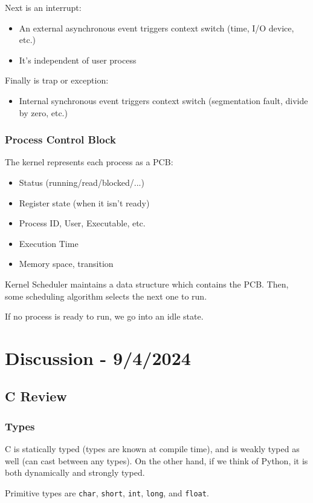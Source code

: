 \documentclass[openany]{book}
\begin{document}
Next is an interrupt:
\begin{itemize}
	\item An external asynchronous event triggers context switch (time, I/O device, etc.)
	\item It's independent of user process
\end{itemize}

Finally is trap or exception:
\begin{itemize}
	\item Internal synchronous event triggers context switch (segmentation fault, divide by zero, etc.)
\end{itemize}

\subsubsection{Process Control Block}
The kernel represents each process as a PCB:
\begin{itemize}
	\item Status (running/read/blocked/...)
	\item Register state (when it isn't ready)
	\item Process ID, User, Executable, etc.
	\item Execution Time
	\item Memory space, transition
\end{itemize}

Kernel Scheduler maintains a data structure which contains the PCB. Then, some scheduling algorithm selects the next one to run.

If no process is ready to run, we go into an idle state.

\section{Discussion - 9/4/2024}
\subsection{C Review}
\subsubsection{Types}
C is statically typed (types are known at compile time), and is weakly typed as well (can cast between any types). On the other hand, if we think of Python, it is both dynamically and strongly typed.

Primitive types are \texttt{char}, \texttt{short}, \texttt{int}, \texttt{long}, and \texttt{float}.
\end{document}
